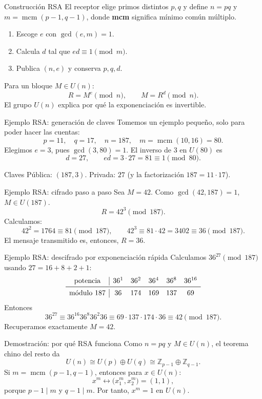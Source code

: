 \documentclass[aspectratio=169,11pt]{beamer}
\newcommand{\modn}[1]{\pmod{#1}}
\begin{document}
\begin{frame}{Construcción RSA}
  El receptor elige primos distintos $p,q$ y define $n=pq$ y
  $m=\operatorname{mcm}(p-1,q-1)$, donde \textbf{mcm} significa mínimo común múltiplo.
  \begin{enumerate}
    \item Escoge $e$ con $\gcd(e,m)=1$.
    \item Calcula $d$ tal que $ed\equiv1\modn{m}$.
    \item Publica $(n,e)$ y conserva $p,q,d$.
  \end{enumerate}
  Para un bloque $M\in U(n)$:
  \[
    R=M^e\modn{n},\qquad M=R^d\modn{n}.
  \]
  El grupo $U(n)$ explica por qué la exponenciación es invertible.
\end{frame}

\begin{frame}{Ejemplo RSA: generación de claves}
  Tomemos un ejemplo pequeño, solo para poder hacer las cuentas:
  \[
    p=11,\quad q=17,\quad n=187,\quad m=\operatorname{mcm}(10,16)=80.
  \]
  Elegimos $e=3$, pues $\gcd(3,80)=1$. El inverso de $3$ en $U(80)$ es
  \[
    d=27,\qquad ed=3\cdot27=81\equiv1\modn{80}.
  \]
  \begin{block}{Claves}
    Pública: $(187,3)$. \qquad Privada: $27$ (y la factorización $187=11\cdot17$).
  \end{block}
\end{frame}

\begin{frame}{Ejemplo RSA: cifrado paso a paso}
  Sea $M=42$. Como $\gcd(42,187)=1$, $M\in U(187)$.
  \[
    R=42^3\modn{187}.
  \]
  Calculamos:
  \[
    42^2=1764\equiv81\modn{187},\qquad
    42^3\equiv81\cdot42=3402\equiv36\modn{187}.
  \]
  El mensaje transmitido es, entonces, $R=36$.
\end{frame}

\begin{frame}{Ejemplo RSA: descifrado por exponenciación rápida}
  Calculamos $36^{27}\modn{187}$ usando $27=16+8+2+1$:
  \[
  \begin{array}{c|ccccc}
  \text{potencia}&36^1&36^2&36^4&36^8&36^{16}\\ \midrule
  \text{módulo }187&36&174&169&137&69
  \end{array}
  \]
  Entonces
  \[
    36^{27}\equiv36^{16}36^8 36^2 36
    \equiv69\cdot137\cdot174\cdot36\equiv42\modn{187}.
  \]
  Recuperamos exactamente $M=42$.
\end{frame}

\begin{frame}{Demostración: por qué RSA funciona}
  Como $n=pq$ y $M\in U(n)$, el teorema chino del resto da
  \[
    U(n)\cong U(p)\oplus U(q)\cong\mathbb Z_{p-1}\oplus\mathbb Z_{q-1}.
  \]
  Si $m=\operatorname{mcm}(p-1,q-1)$, entonces para $x\in U(n)$:
  \[
    x^m\leftrightarrow\bigl(x_1^m,x_2^m\bigr)=(1,1),
  \]
  porque $p-1\mid m$ y $q-1\mid m$.
  Por tanto, $x^m=1$ en $U(n)$.
\end{frame}
\end{document}
